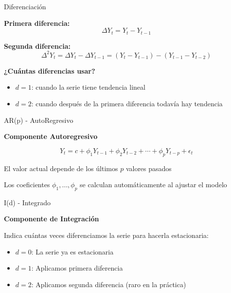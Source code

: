 \documentclass{beamer}
\begin{document}
\begin{frame}{Diferenciación}
    \begin{center}
        \textbf{Primera diferencia:}
        \[
        \Delta Y_t = Y_t - Y_{t-1}
        \]
        
        \textbf{Segunda diferencia:}
        \[
        \Delta^2 Y_t = \Delta Y_t - \Delta Y_{t-1} = (Y_t - Y_{t-1}) - (Y_{t-1} - Y_{t-2})
        \]
    \end{center}
    
    \vspace{0.3cm}
    
    \textbf{¿Cuántas diferencias usar?}
    \begin{itemize}
        \item $d=1$: cuando la serie tiene tendencia lineal
        \item $d=2$: cuando después de la primera diferencia todavía hay tendencia
    \end{itemize}
\end{frame}

\begin{frame}{AR(p) - AutoRegresivo}
    \begin{center}
        \Large{\textbf{Componente Autoregresivo}}
        
        \[
        Y_t = c + \phi_1 Y_{t-1} + \phi_2 Y_{t-2} + \cdots + \phi_p Y_{t-p} + \epsilon_t
        \]
        
        El valor actual depende de los últimos $p$ valores pasados
        
        \vspace{0.3cm}
        
        Los coeficientes $\phi_1, \ldots, \phi_p$ se calculan automáticamente al ajustar el modelo
    \end{center}
\end{frame}

\begin{frame}{I(d) - Integrado}
    \begin{center}
        \Large{\textbf{Componente de Integración}}
        
        Indica cuántas veces diferenciamos la serie para hacerla estacionaria:
        
        
        \begin{itemize}
            \item $d=0$: La serie ya es estacionaria
            \item $d=1$: Aplicamos primera diferencia
            \item $d=2$: Aplicamos segunda diferencia (raro en la práctica)
        \end{itemize}
    \end{center}
\end{frame}
\end{document}
